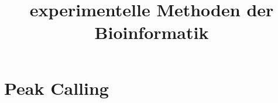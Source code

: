 \documentclass[12pt,a4paper]{article}
\title{\Huge\textbf{experimentelle Methoden der Bioinformatik}}
\author{}
\date{}
\begin{document}
\begin{titlepage}

\maketitle
\thispagestyle{empty}
\end{titlepage}
\newpage

\begin{titlepage}
\tableofcontents
\thispagestyle{empty}
\end{titlepage}
\newpage



\newpage



\newpage

\section{Peak Calling}
\end{document}
